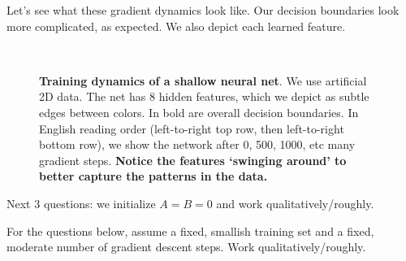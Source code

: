   Let's see what these gradient dynamics look like.
  Our decision boundaries
  look more complicated, as expected.  We also depict each learned feature.
        \begin{figure}[h]%
          \\%
          \caption{\textbf{Training dynamics of a shallow neural net}.
            We use artificial 2D data.  The net has 8 hidden features, which we
            depict as subtle edges between colors.  In bold are overall
            decision boundaries.  In English reading order (left-to-right top
            row, then left-to-right bottom row), we show the network after 0,
            500, 1000, etc
            many gradient steps.
            \textbf{Notice the features `swinging around' to better capture the
            patterns in the data.}
            }
        \end{figure}

        Next $3$ questions: we initialize $A=B=0$ and work qualitatively/roughly.

        For the questions below, assume a fixed, smallish training set
        and a fixed, moderate number of gradient descent steps.
        Work qualitatively/roughly.

